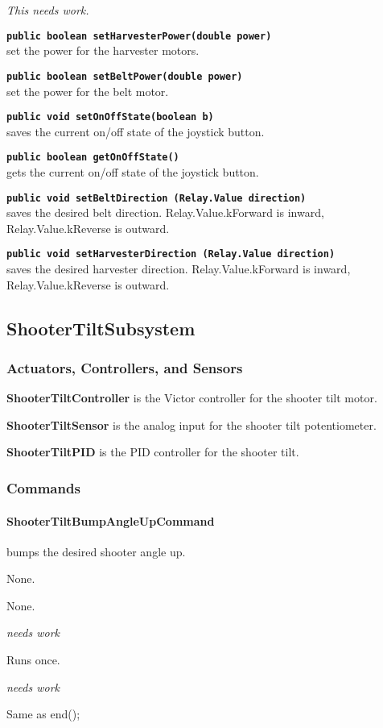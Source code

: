 \documentclass[]{article}
\begin{document}
\emph{This needs work.}

\noindent \texttt{\textbf{public boolean setHarvesterPower(double power)}} \\
set the power for the harvester motors.

\noindent \texttt{\textbf{public boolean setBeltPower(double power)}} \\
set the power for the belt motor.

\noindent \texttt{\textbf{public void setOnOffState(boolean b)}} \\
saves the current on/off state of the joystick button.

\noindent \texttt{\textbf{public boolean getOnOffState()}} \\
gets the current on/off state of the joystick button.

\noindent \texttt{\textbf{public void setBeltDirection (Relay.Value direction)}} \\
saves the desired belt direction. Relay.Value.kForward is inward, Relay.Value.kReverse is outward.

\noindent \texttt{\textbf{public void setHarvesterDirection (Relay.Value direction)}} \\
saves the desired harvester direction. Relay.Value.kForward is inward, Relay.Value.kReverse is outward.


\subsection{ShooterTiltSubsystem}

\subsubsection{Actuators, Controllers, and Sensors}

\textbf{ShooterTiltController} is the Victor controller for the shooter tilt motor.

\textbf{ShooterTiltSensor} is the analog input for the shooter tilt potentiometer.

\textbf{ShooterTiltPID} is the PID controller for the shooter tilt.

\subsubsection{Commands}

\paragraph{ShooterTiltBumpAngleUpCommand} bumps the desired shooter angle up.
\begin{description}[topsep=0ex]
\item[requires] None.
\item[initialization] None.
\item[execute] \emph{needs work}
\item[isDone] Runs once.
\item[end] \emph{needs work}
\item[interrupted] Same as end();
\end{description}
\end{document}
